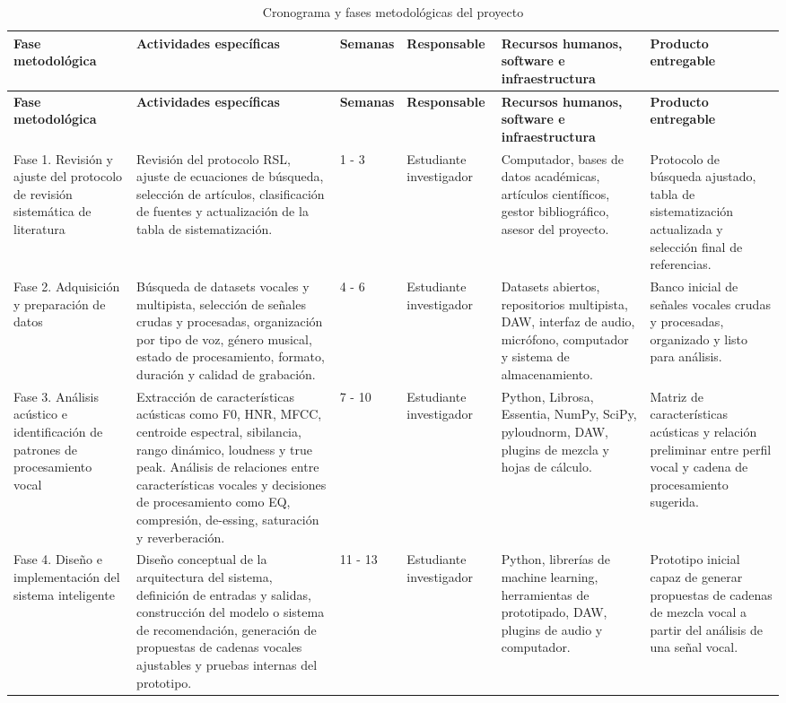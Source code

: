 \begin{longtable}{|p{2.2cm}|p{3.5cm}|p{1.0cm}|p{1.8cm}|p{2.8cm}|p{2.8cm}|}
\caption{Cronograma y fases metodológicas del proyecto}
\label{tab:cronograma} \\
\hline
\textbf{Fase metodológica} & \textbf{Actividades específicas} & \textbf{Semanas} & \textbf{Responsable} & \textbf{Recursos humanos, software e infraestructura} & \textbf{Producto entregable} \\
\hline
\endfirsthead
\hline
\textbf{Fase metodológica} & \textbf{Actividades específicas} & \textbf{Semanas} & \textbf{Responsable} & \textbf{Recursos humanos, software e infraestructura} & \textbf{Producto entregable} \\
\hline
\endhead
\hline
\endfoot
Fase 1. Revisión y ajuste del protocolo de revisión sistemática de literatura & Revisión del protocolo RSL, ajuste de ecuaciones de búsqueda, selección de artículos, clasificación de fuentes y actualización de la tabla de sistematización. & 1 - 3 & Estudiante investigador & Computador, bases de datos académicas, artículos científicos, gestor bibliográfico, asesor del proyecto. & Protocolo de búsqueda ajustado, tabla de sistematización actualizada y selección final de referencias. \\
\hline
Fase 2. Adquisición y preparación de datos & Búsqueda de datasets vocales y multipista, selección de señales crudas y procesadas, organización por tipo de voz, género musical, estado de procesamiento, formato, duración y calidad de grabación. & 4 - 6 & Estudiante investigador & Datasets abiertos, repositorios multipista, DAW, interfaz de audio, micrófono, computador y sistema de almacenamiento. & Banco inicial de señales vocales crudas y procesadas, organizado y listo para análisis. \\
\hline
Fase 3. Análisis acústico e identificación de patrones de procesamiento vocal & Extracción de características acústicas como F0, HNR, MFCC, centroide espectral, sibilancia, rango dinámico, loudness y true peak. Análisis de relaciones entre características vocales y decisiones de procesamiento como EQ, compresión, de-essing, saturación y reverberación. & 7 - 10 & Estudiante investigador & Python, Librosa, Essentia, NumPy, SciPy, pyloudnorm, DAW, plugins de mezcla y hojas de cálculo. & Matriz de características acústicas y relación preliminar entre perfil vocal y cadena de procesamiento sugerida. \\
\hline
Fase 4. Diseño e implementación del sistema inteligente & Diseño conceptual de la arquitectura del sistema, definición de entradas y salidas, construcción del modelo o sistema de recomendación, generación de propuestas de cadenas vocales ajustables y pruebas internas del prototipo. & 11 - 13 & Estudiante investigador & Python, librerías de machine learning, herramientas de prototipado, DAW, plugins de audio y computador. & Prototipo inicial capaz de generar propuestas de cadenas de mezcla vocal a partir del análisis de una señal vocal. \\

\end{longtable}
